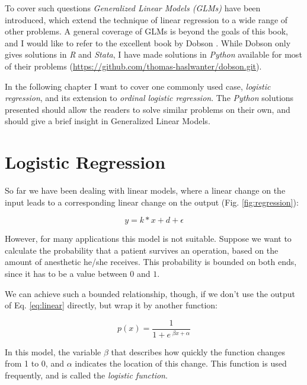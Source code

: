 To cover such questions \emph{Generalized Linear Models (GLMs)} have been introduced, which extend the technique of linear regression to a wide range of other problems. A general coverage of GLMs is beyond the goals of this book, and I would like to refer to the excellent book by Dobson \cite{Dobson2008}. While Dobson only gives solutions in \emph{R} and \emph{Stata}, I have made solutions in \emph{Python} available for most of their problems (\url{https://github.com/thomas-haslwanter/dobson.git}).

In the following chapter I want to cover one commonly used case, \emph{logistic regression}, and its extension to \emph{ordinal logistic regression}. The \emph{Python} solutions presented should allow the readers to solve similar problems on their own, and should give a brief insight in Generalized Linear Models.

\section{Logistic Regression}

So far we have been dealing with linear models, where a linear change on the input leads to a corresponding linear change on the output (Fig. \ref{fig:regression}):

 \begin{equation}\label{eq:linear}
   y = k*x + d + \epsilon
 \end{equation}

However, for many applications this model is not suitable. Suppose we want to calculate the probability that a patient survives an operation, based on the amount of anesthetic he/she receives. This probability is bounded on both ends, since it has to be a value between $0$ and $1$.

We can achieve such a bounded relationship, though, if we don't use the output of Eq. \ref{eq:linear} directly, but wrap it by another function:

\begin{equation}\label{eq:logisticFcn}
  p(x) = \frac{1}{ 1 + e^{ \;\beta x + \alpha } }
\end{equation}

In this model, the variable $\beta$ that describes how quickly the function changes from 1 to 0, and $\alpha$ indicates the location of this change. This function is used frequently, and is called the \emph{logistic function}.

